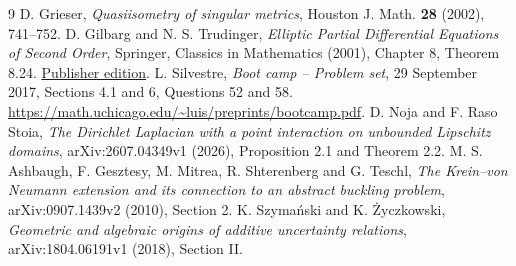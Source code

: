 \documentclass[11pt]{article}
\theoremstyle{remark}\newtheorem{remark}[theorem]{Remark}
\begin{document}
\begin{thebibliography}{9}
 D. Grieser, \emph{Quasiisometry of singular metrics},
Houston J. Math. \textbf{28} (2002), 741--752.
 D. Gilbarg and N. S. Trudinger,
\emph{Elliptic Partial Differential Equations of Second Order},
Springer, Classics in Mathematics (2001), Chapter 8, Theorem 8.24.
\href{https://doi.org/10.1007/978-3-642-61798-0}{Publisher edition}.
 L. Silvestre, \emph{Boot camp -- Problem set},
29 September 2017, Sections 4.1 and 6, Questions 52 and 58.
\url{https://math.uchicago.edu/~luis/preprints/bootcamp.pdf}.
 D. Noja and F. Raso Stoia,
\emph{The Dirichlet Laplacian with a point interaction on unbounded
Lipschitz domains}, arXiv:2607.04349v1 (2026), Proposition 2.1 and Theorem 2.2.
 M. S. Ashbaugh, F. Gesztesy, M. Mitrea, R. Shterenberg
and G. Teschl, \emph{The Krein--von Neumann extension and its connection
to an abstract buckling problem}, arXiv:0907.1439v2 (2010), Section 2.
 K. Szyma\'nski and K. \.Zyczkowski,
\emph{Geometric and algebraic origins of additive uncertainty relations},
arXiv:1804.06191v1 (2018), Section II.
\end{thebibliography}
\end{document}
